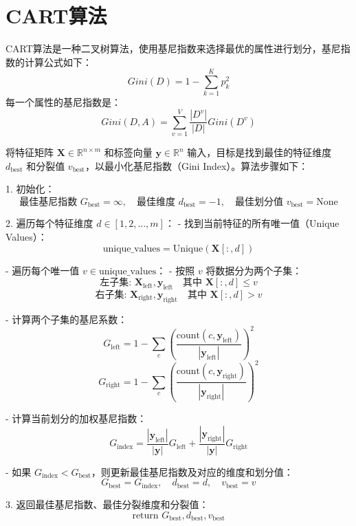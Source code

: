 \documentclass[12pt,a4paper,oneside]{article}
\begin{document}
\section{CART算法}
CART算法是一种二叉树算法，使用基尼指数来选择最优的属性进行划分，基尼指数的计算公式如下：
$$Gini(D)=1-\sum_{k=1}^K p_k^2$$
每一个属性的基尼指数是：
$$Gini(D,A)=\sum_{v=1}^V \frac{|D^v|}{|D|}Gini(D^v)$$

将特征矩阵 $\mathbf{X} \in \mathbb{R}^{n \times m}$ 和标签向量 $\mathbf{y} \in \mathbb{R}^{n}$ 输入，目标是找到最佳的特征维度 $d_{\text{best}}$ 和分裂值 $v_{\text{best}}$，以最小化基尼指数（Gini Index）。算法步骤如下：

1. 初始化：
   \[
   \text{最佳基尼指数 } G_{\text{best}} = \infty, \quad \text{最佳维度 } d_{\text{best}} = -1, \quad \text{最佳划分值 } v_{\text{best}} = \text{None}
   \]

2. 遍历每个特征维度 $d \in [1, 2, \ldots, m]$：
   - 找到当前特征的所有唯一值（Unique Values）：
     \[
     \text{unique\_values} = \text{Unique}(\mathbf{X}[:, d])
     \]

   - 遍历每个唯一值 $v \in \text{unique\_values}$：
     - 按照 $v$ 将数据分为两个子集：
       \[
       \text{左子集: } \mathbf{X}_{\text{left}}, \mathbf{y}_{\text{left}} \quad \text{其中 } \mathbf{X}[:, d] \leq v
       \]
       \[
       \text{右子集: } \mathbf{X}_{\text{right}}, \mathbf{y}_{\text{right}} \quad \text{其中 } \mathbf{X}[:, d] > v
       \]

     - 计算两个子集的基尼系数：
       \[
       G_{\text{left}} = 1 - \sum_{c} \left( \frac{\text{count}(c, \mathbf{y}_{\text{left}})}{|\mathbf{y}_{\text{left}}|} \right)^2
       \]
       \[
       G_{\text{right}} = 1 - \sum_{c} \left( \frac{\text{count}(c, \mathbf{y}_{\text{right}})}{|\mathbf{y}_{\text{right}}|} \right)^2
       \]

     - 计算当前划分的加权基尼指数：
       \[
       G_{\text{index}} = \frac{|\mathbf{y}_{\text{left}}|}{|\mathbf{y}|} G_{\text{left}} + \frac{|\mathbf{y}_{\text{right}}|}{|\mathbf{y}|} G_{\text{right}}
       \]

     - 如果 $G_{\text{index}} < G_{\text{best}}$，则更新最佳基尼指数及对应的维度和划分值：
       \[
       G_{\text{best}} = G_{\text{index}}, \quad d_{\text{best}} = d, \quad v_{\text{best}} = v
       \]

3. 返回最佳基尼指数、最佳分裂维度和分裂值：
   \[
   \text{return } G_{\text{best}}, d_{\text{best}}, v_{\text{best}}
   \]
\end{document}
